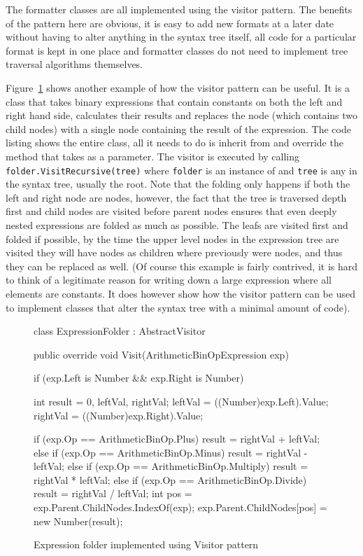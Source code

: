   The formatter classes are all implemented using the visitor pattern. The 
  benefits of the pattern here are obvious, it is easy to add new formats at a 
  later date without having to alter anything in the syntax tree itself, all 
  code for a particular format is kept in one place and formatter classes do 
  not need to implement tree traversal algorithms themselves.

	Figure~\ref{fig:expression_folder} shows another example of how the 
	visitor pattern can be useful. It is a class that takes binary 
	expressions that contain constants on both the left and right hand side, 
	calculates their results and replaces the  
	node (which contains two child nodes) with a single  node 
	containing the result of the expression. The code listing shows the entire 
	 class, all it needs to do is inherit from 
	 and override the  method that takes 
	 as a parameter. The visitor is executed 
	by calling \texttt{folder.VisitRecursive(tree)} where \texttt{folder} is an 
	instance of  and \texttt{tree} is any  
	in the syntax tree, usually the root. Note that the folding only happens if 
	both the left and right node are  nodes, however, the fact 
	that the tree is traversed depth first and child nodes are visited before 
	parent nodes ensures that even deeply nested expressions are folded as much 
	as possible. The leafs are visited first and folded if possible, by the time 
	the upper level nodes in the expression tree are visited they will have 
	 nodes as children where previously were
	 nodes, and thus they can be replaced 
	as well. (Of course this example is fairly contrived, it is hard to think of
	a legitimate reason for writing down a large expression where all elements
	are constants. It does however show how the visitor pattern can be used to 
	implement classes that alter the syntax tree with a minimal amount of code).
	
	\begin{figure}[h!]
	\begin{csharp}
class ExpressionFolder : AbstractVisitor{

  public override void Visit(ArithmeticBinOpExpression exp) {
    if (exp.Left is Number && exp.Right is Number) {
      int result = 0, leftVal, rightVal;
      leftVal = ((Number)exp.Left).Value;
      rightVal = ((Number)exp.Right).Value;
		
      if (exp.Op == ArithmeticBinOp.Plus) {
        result = rightVal + leftVal;
      } else if (exp.Op == ArithmeticBinOp.Minus) {
        result = rightVal - leftVal;
      } else if (exp.Op == ArithmeticBinOp.Multiply) {
        result = rightVal * leftVal;
      } else if (exp.Op == ArithmeticBinOp.Divide) {
        result = rightVal / leftVal;
      }
      int pos = exp.Parent.ChildNodes.IndexOf(exp);
      exp.Parent.ChildNodes[pos] = new Number(result);
    }
  }
}
\end{csharp}
\caption{Expression folder implemented using Visitor pattern} \label{fig:expression_folder}
\end{figure}

